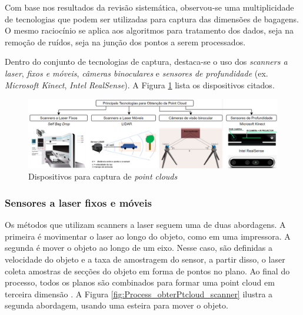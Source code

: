     Com base nos resultados da revisão sistemática, observou-se uma multiplicidade de tecnologias que podem ser utilizadas para captura das dimensões de bagagens. O mesmo raciocínio se aplica aos algoritmos para tratamento dos dados, seja na remoção de ruídos, seja na junção dos pontos a serem processados. 

    Dentro do conjunto de tecnologias de captura, destaca-se o uso dos \textit{scanners a laser}, \textit{fixos e móveis}, \textit{câmeras binoculares} e \textit{sensores de profundidade} (ex. \textit{Microsoft Kinect}, \textit{Intel RealSense}).  A Figura \ref{fig:Disp_captura_ptClouds} lista os dispositivos citados.

        \begin{figure}[h]
           \centering
           \includegraphics[width=1\textwidth]{imagens/Dispositivos_Para_captura_de_pt_Clouds.png} 
           \caption{Dispositivos para captura de \textit{point clouds}}
           \label{fig:Disp_captura_ptClouds}
        \end{figure}


\subsubsection{Sensores a laser fixos e móveis}
\label{subsec_Sensores a laser fixos e moveis}

    Os métodos que utilizam scanners a laser seguem uma de duas abordagens. A primeira é movimentar o laser ao longo do objeto, como em uma impressora. A segunda é mover o objeto ao longo de um eixo. Nesse caso, são definidas a velocidade do objeto e a taxa de amostragem do sensor, a partir disso, o laser coleta amostras de secções do objeto em forma de pontos no plano. Ao final do processo, todos os planos são combinados para formar uma point cloud em terceira dimensão \cite{gao_2018_minimum, hyypp_2020_accurate}. A Figura \ref{fig:Process_obterPtcloud_scanner} ilustra a segunda abordagem, usando uma esteira para mover o objeto.  

